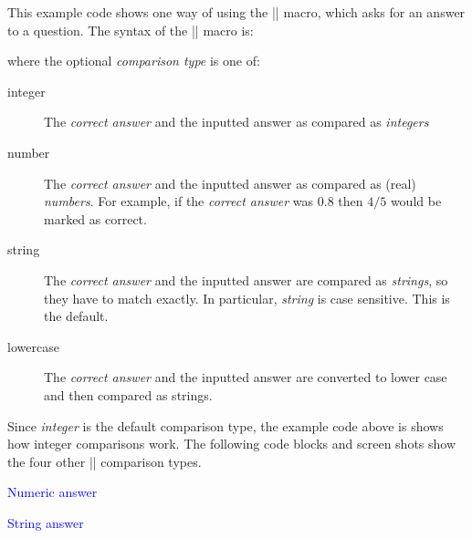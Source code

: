 \documentclass[svgnames]{article}
\begin{document}
  This example code shows one way of using the \LatexCode|\answer| macro, which
  asks for an answer to a question. The syntax of the
  \LatexCode|\answer| macro is:
  \begin{latexcode}
  \end{latexcode}
  where the optional \textit{comparison type} is one of:
  \begin{description}
      \item[integer] 
      The \textit{correct answer} and the inputted answer
      as compared as \textit{integers}
      \item[number] 
      The \textit{correct answer} and the inputted answer
      as compared as (real) \textit{numbers}. For example, if the
      \textit{correct answer} was $0.8$ then $4/5$ would be marked as
      correct.
      \item[string] 
      The \textit{correct answer} and the inputted answer are compared
      as \textit{strings}, so they have to match exactly. In particular,
      \textit{string} is case sensitive. This is the default.
      \item[lowercase] 
      The \textit{correct answer} and the inputted answer
      are converted to lower case and then compared as strings.
  \end{description}

  Since \textit{integer} is the default comparison type, the example
  code above is shows how integer comparisons work. The following code
  blocks and screen shots show the four other \LatexCode|\answer|
  comparison types.

  \textcolor{blue}{Numeric answer}

  \textcolor{blue}{String answer}
\end{document}
